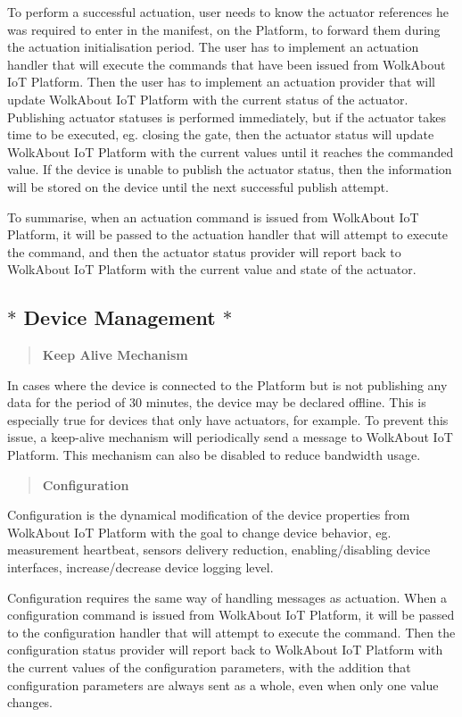To perform a successful actuation, user needs to know the actuator references he was required to enter in the manifest, on the Platform, to forward them during the actuation initialisation period. The user has to implement an actuation handler that will execute the commands that have been issued from Wolk\+About IoT Platform. Then the user has to implement an actuation provider that will update Wolk\+About IoT Platform with the current status of the actuator. Publishing actuator statuses is performed immediately, but if the actuator takes time to be executed, eg. closing the gate, then the actuator status will update Wolk\+About IoT Platform with the current values until it reaches the commanded value. If the device is unable to publish the actuator status, then the information will be stored on the device until the next successful publish attempt.

To summarise, when an actuation command is issued from Wolk\+About IoT Platform, it will be passed to the actuation handler that will attempt to execute the command, and then the actuator status provider will report back to Wolk\+About IoT Platform with the current value and state of the actuator.

\subsection*{$\ast$ Device Management $\ast$}

\label{_keep-alive-mechanism}%
 \begin{quote}
{\bfseries Keep Alive Mechanism} \end{quote}
In cases where the device is connected to the Platform but is not publishing any data for the period of 30 minutes, the device may be declared offline. This is especially true for devices that only have actuators, for example. To prevent this issue, a keep-\/alive mechanism will periodically send a message to Wolk\+About IoT Platform. This mechanism can also be disabled to reduce bandwidth usage.

\label{_configuration}%
 \begin{quote}
{\bfseries Configuration} \end{quote}
Configuration is the dynamical modification of the device properties from Wolk\+About IoT Platform with the goal to change device behavior, eg. measurement heartbeat, sensors delivery reduction, enabling/disabling device interfaces, increase/decrease device logging level.

Configuration requires the same way of handling messages as actuation. When a configuration command is issued from Wolk\+About IoT Platform, it will be passed to the configuration handler that will attempt to execute the command. Then the configuration status provider will report back to Wolk\+About IoT Platform with the current values of the configuration parameters, with the addition that configuration parameters are always sent as a whole, even when only one value changes.

